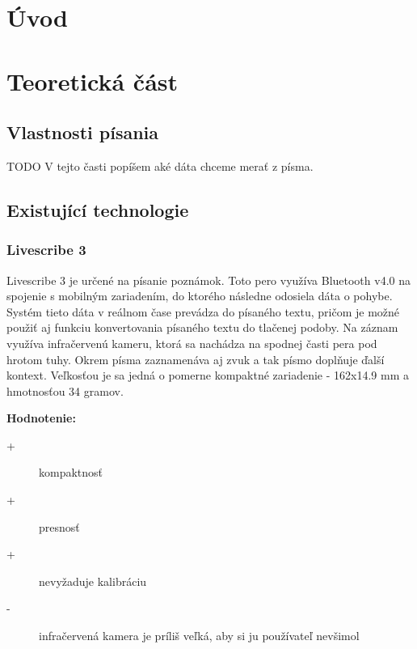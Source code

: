 \chapter{Úvod}



\chapter{Teoretická část}

\section{Vlastnosti písania}

TODO
V tejto časti popíšem aké dáta chceme merať z písma.

\section{Existující technologie}

\subsection*{Livescribe 3}

Livescribe 3 je určené na písanie poznámok. Toto pero využíva Bluetooth v4.0 na spojenie s mobilným zariadením, do ktorého následne odosiela dáta o pohybe. Systém tieto dáta v reálnom čase prevádza do písaného textu, pričom je možné použiť aj funkciu konvertovania písaného textu do tlačenej podoby. Na záznam využíva infračervenú kameru, ktorá sa nachádza na spodnej časti pera pod hrotom tuhy. Okrem písma zaznamenáva aj zvuk a tak písmo doplňuje ďalší kontext. Veľkosťou je sa jedná o pomerne kompaktné zariadenie - 162x14.9 mm a hmotnosťou 34 gramov.\newline

\textbf{Hodnotenie:}
\begin{description}
	\item[+]{kompaktnosť}
	\item[+]{presnosť}
	\item[+]{nevyžaduje kalibráciu}
	\item[-]{infračervená kamera je príliš veľká, aby si ju používateľ nevšimol}
\end{description}

